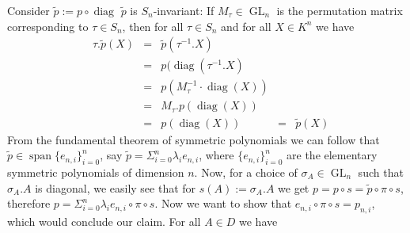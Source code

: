 \begin{dexample}
  Consider $\tilde{p} := p \circ \operatorname{diag}$
  $\tilde{p}$ is $S_n$-invariant:
  If $M_\tau \in \operatorname{GL}_n$ is the permutation matrix corresponding to $\tau \in S_n$, then for all $\tau \in S_n$ and for all $ X \in K^n$ we have
  \begin{equation}
    \begin{aligned}
      &\tau.\tilde{p} (X) &=& \tilde{p} (\tau^{-1}.X)\\
      &&=& p ( \operatorname{diag}(\tau^{-1}.X)\\
      &&=& p( M_\tau^{-1} \cdot \operatorname{diag} (X))\\
      &&=& M_\tau . p (\operatorname{diag}(X))\\
      &&=& p (\operatorname{diag}(X))&=& \tilde{p} (X)
    \end{aligned}
  \end{equation}
  From the fundamental theorem of symmetric polynomials we can follow that $\tilde{p} \in \operatorname{span}\{e_{n,i}\}_{i=0}^n$, say $\tilde{p} = \Sigma_{i=0}^n \lambda_i e_{n,i}$, where $\{ e_{n,i} \}_{i=0}^n$ are the elementary symmetric polynomials of dimension $n$.
  Now, for a choice of $\sigma_A \in \operatorname{GL}_n$ such that $\sigma_A . A$ is diagonal, we easily see that for $s(A) := \sigma_A . A$ we get $p = p \circ s = \tilde{p} \circ \pi \circ s$, therefore $p = \Sigma_{i=0}^n \lambda_i e_{n,i} \circ \pi \circ s$.
  Now we want to show that $e_{n,i} \circ \pi \circ s = p_{n,i}$, which would conclude our claim.
  For all $A\in D$ we have
  \begin{equation}
    \begin{aligned}

\end{aligned}
\end{equation}
\end{dexample}

